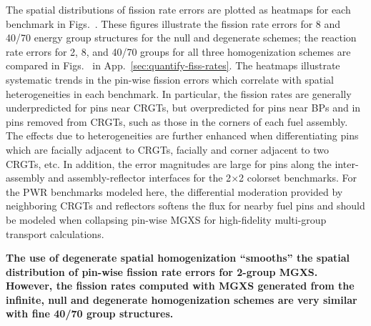 The spatial distributions of fission rate errors are plotted as heatmaps for each benchmark in Figs.~. These figures illustrate the fission rate errors for 8 and 40/70 energy group structures for the null and degenerate schemes; the reaction rate errors for 2, 8, and 40/70 groups for all three homogenization schemes are compared in Figs.~ in App.~\ref{sec:quantify-fiss-rates}. The heatmaps illustrate systematic trends in the pin-wise fission errors which correlate with spatial heterogeneities in each benchmark. In particular, the fission rates are generally underpredicted for pins near \acp{CRGT}, but overpredicted for pins near \acp{BP} and in pins removed from \acp{CRGT}, such as those in the corners of each fuel assembly. The effects due to heterogeneities are further enhanced when differentiating pins which are facially adjacent to \acp{CRGT}, facially and corner adjacent to two \acp{CRGT}, etc. In addition, the error magnitudes are large for pins along the inter-assembly and assembly-reflector interfaces for the 2$\times$2 colorset benchmarks. For the \ac{PWR} benchmarks modeled here, the differential moderation provided by neighboring \acp{CRGT} and reflectors softens the flux for nearby fuel pins and should be modeled when collapsing pin-wise \ac{MGXS} for high-fidelity multi-group transport calculations.


\begin{emphbox}
\textbf{The use of degenerate spatial homogenization ``smooths'' the spatial distribution of pin-wise fission rate errors for 2-group \ac{MGXS}. However, the fission rates computed with \ac{MGXS} generated from the infinite, null and degenerate homogenization schemes are very similar with fine 40/70 group structures.}
\end{emphbox}

